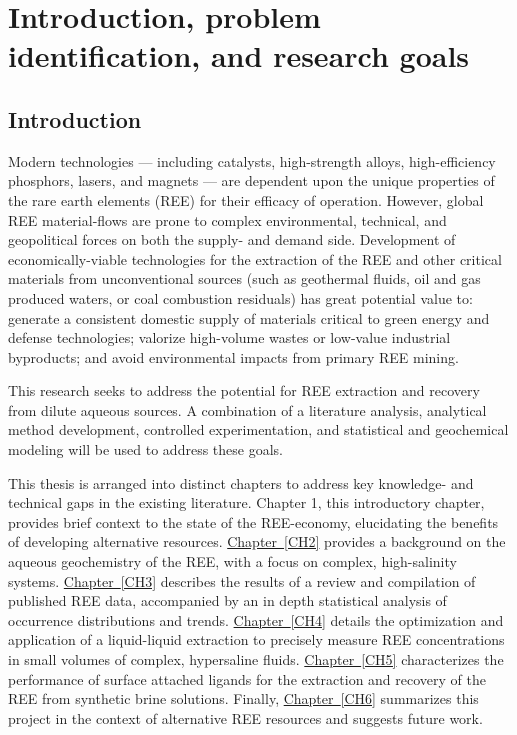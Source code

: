 \chapter{Introduction, problem identification, and research goals}


\section{Introduction}

Modern technologies --- including catalysts, high-strength alloys, high-efficiency phosphors, lasers, and magnets --- are dependent upon the unique properties of the rare earth elements (REE) for their efficacy of operation.
However, global REE material-flows are prone to complex environmental, technical, and geopolitical forces on both the supply- and demand side.
Development of economically-viable technologies for the extraction of the REE and other critical materials from unconventional sources (such as geothermal fluids, oil and gas produced waters, or coal combustion residuals) has great potential value to:
generate a consistent domestic supply of materials critical to green energy and defense technologies;
valorize high-volume wastes or low-value industrial byproducts;
and avoid environmental impacts from primary REE mining.

This research seeks to address the potential for REE extraction and recovery from dilute aqueous sources.
A combination of a literature analysis, analytical method development, controlled experimentation, and statistical and geochemical modeling will be used to address these goals.

This thesis is arranged into distinct chapters to address key knowledge- and technical gaps in the existing literature.
Chapter 1, this introductory chapter, provides brief context to the state of the REE-economy, elucidating the benefits of developing alternative resources.
\hyperref[CH2]{Chapter~\ref*{CH2}} provides a background on the aqueous geochemistry of the REE, with a focus on complex, high-salinity systems.
\hyperref[CH3]{Chapter~\ref*{CH3}} describes the results of a review and compilation of published REE data, accompanied by an in depth statistical analysis of occurrence distributions and trends.
\hyperref[CH4]{Chapter~\ref*{CH4}} details the optimization and application of a liquid-liquid extraction to precisely measure REE concentrations in small volumes of complex, hypersaline fluids.
\hyperref[CH5]{Chapter~\ref*{CH5}} characterizes the performance of surface attached ligands for the extraction and recovery of the REE from synthetic brine solutions.
Finally, \hyperref[CH6]{Chapter~\ref*{CH6}} summarizes this project in the context of alternative REE resources and suggests future work.

